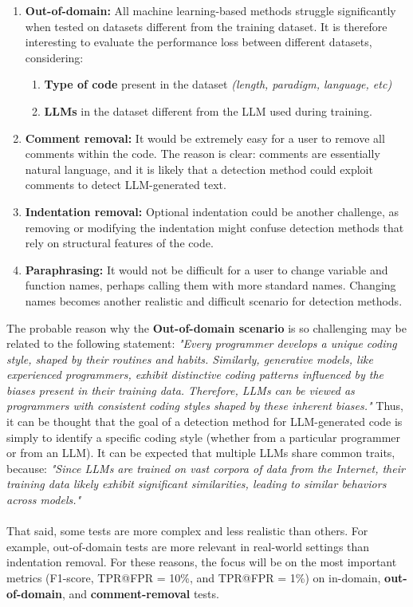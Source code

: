 \begin{enumerate}
\item \textbf{Out-of-domain:} All machine learning-based methods struggle significantly 
when tested on datasets different from the training dataset. It is therefore 
interesting to evaluate the performance loss between different datasets, considering:
    \begin{enumerate}
    \item \textbf{Type of code} present in the dataset \textit{(length, paradigm, language, etc)}
    \item \textbf{LLMs} in the dataset different from the LLM used during training.
    \end{enumerate}
\item \textbf{Comment removal:} It would be extremely easy for a user to remove all 
comments within the code. The reason is clear: comments are essentially 
natural language, and it is likely that a detection method could exploit 
comments to detect LLM-generated text.

\item \textbf{Indentation removal:} Optional indentation could be another challenge, 
as removing or modifying the indentation might confuse detection methods 
that rely on structural features of the code.

\item \textbf{Paraphrasing:} It would not be difficult for a user to change variable and 
function names, perhaps calling them with more standard names. 
Changing names becomes another realistic and difficult scenario for detection methods.
\end{enumerate}

The probable reason why the \textbf{Out-of-domain scenario} is so challenging 
may be related to the following statement:
\textit{"Every programmer develops a unique coding style, shaped by their 
routines and habits. Similarly, generative models, like experienced 
programmers, exhibit distinctive coding patterns influenced by the 
biases present in their training data. Therefore, LLMs can be viewed 
as programmers with consistent coding styles shaped by these inherent biases."}
\cite{ye2023uncovering}
Thus, it can be thought that the goal of a detection method for 
LLM-generated code is simply to identify a specific coding style 
(whether from a particular programmer or from an LLM). 
It can be expected that multiple LLMs share common traits, because:
\textit{"Since LLMs are trained on vast corpora of data from the Internet, 
their training data likely exhibit significant similarities, leading 
to similar behaviors across models."}\cite{guo2024biscope}
\\\\
That said, some tests are more complex and less realistic 
than others. For example, out-of-domain tests are more relevant 
in real-world settings than indentation removal. For these reasons, 
the focus will be on the most important metrics 
(F1-score, TPR@FPR = 10\%, and TPR@FPR = 1\%) 
on in-domain, \textbf{out-of-domain}, and \textbf{comment-removal} tests.

